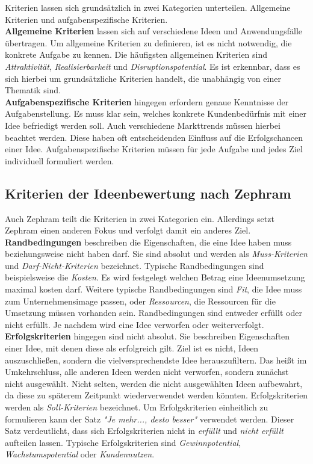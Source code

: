 Kriterien lassen sich grundsätzlich in zwei Kategorien unterteilen. Allgemeine Kriterien und aufgabenspezifische Kriterien.\\
\textbf{Allgemeine Kriterien} lassen sich auf verschiedene Ideen und Anwendungsfälle übertragen.
Um allgemeine Kriterien zu definieren, ist es nicht notwendig, die konkrete Aufgabe zu kennen. 
Die häufigsten allgemeinen Kriterien sind \textit{Attraktivität}, \textit{Realisierbarkeit} und 
\textit{Disruptionspotential}. Es ist erkennbar, dass es sich hierbei um grundsätzliche Kriterien handelt, die unabhängig von einer Thematik sind.\\
\textbf{Aufgabenspezifische Kriterien} hingegen erfordern genaue Kenntnisse der Aufgabenstellung. Es muss klar sein, welches 
konkrete Kundenbedürfnis mit einer Idee befriedigt werden soll. Auch verschiedene Markttrends müssen hierbei beachtet werden. 
Diese haben oft entscheidenden Einfluss auf die Erfolgschancen einer Idee. Aufgabenspezifische Kriterien müssen für jede Aufgabe und jedes Ziel 
individuell formuliert werden.
\cite{grossklaus:2008}

\subsection{Kriterien der Ideenbewertung nach Zephram}
Auch Zephram teilt die Kriterien in zwei Kategorien ein. Allerdings setzt Zephram einen anderen Fokus und verfolgt 
damit ein anderes Ziel.\\

\textbf{Randbedingungen} beschreiben die Eigenschaften, die eine Idee haben muss
beziehungsweise nicht haben darf. Sie sind absolut und werden als \textit{Muss-Kriterien}
und \textit{Darf-Nicht-Kriterien} bezeichnet.
Typische Randbedingungen sind beispielsweise die \textit{Kosten}. 
Es wird festgelegt welchen Betrag eine Ideenumsetzung maximal kosten darf. 
Weitere typische Randbedingungen sind \textit{Fit}, die Idee muss zum Unternehmensimage passen, oder \textit{Ressourcen}, die Ressourcen für die
Umsetzung müssen vorhanden sein. 
Randbedingungen sind entweder erfüllt oder nicht erfüllt. Je nachdem wird eine Idee verworfen oder weiterverfolgt. \\

\textbf{Erfolgskriterien} hingegen sind nicht absolut. Sie beschreiben Eigenschaften einer Idee, 
mit denen diese als erfolgreich gilt. Ziel ist es nicht, Ideen auszuschließen, sondern die
vielversprechendste Idee herauszufiltern. Das heißt im Umkehrschluss, alle anderen Ideen werden nicht 
verworfen, sondern zunächst nicht ausgewählt. Nicht selten, werden die nicht ausgewählten Ideen aufbewahrt, da diese zu späterem 
Zeitpunkt wiederverwendet werden könnten. Erfolgskriterien werden als \textit{Soll-Kriterien} bezeichnet. Um 
Erfolgskriterien einheitlich zu formulieren kann der Satz \textit{"Je mehr..., desto besser"} verwendet werden.
Dieser Satz verdeutlicht, dass sich Erfolgskriterien nicht in \textit{erfüllt} und \textit{nicht erfüllt} aufteilen 
lassen. Typische Erfolgskriterien sind \textit{Gewinnpotential}, \textit{Wachstumspotential} oder \textit{Kundennutzen}.\\

